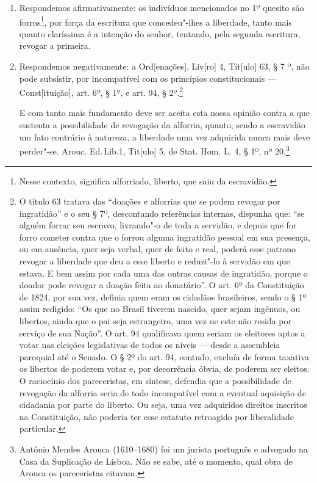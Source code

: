 \begin{enumerate}[label=Ao \arabic*º]
\item Respondemos afirmativamente: os indivíduos mencionados no 1º
quesito são forros\footnote{Nesse contexto, significa alforriado,
  liberto, que saiu da escravidão.}, por força da escritura que
concedeu"-lhes a liberdade, tanto mais quanto claríssima é a intenção do
senhor, tentando, pela segunda escritura, revogar a primeira.

\item Respondemos negativamente: a Ord{[}enações{]}, Liv{[}ro{]} 4,
Tít{[}ulo{]} 63, § 7 º, não pode subsistir, por incompatível com os
princípios constitucionais --- Const{[}ituição{]}, art. 6º, § 1º, e
art. 94, § 2º.\footnote{O título 63 tratava das ``doações e alforrias
  que se podem revogar por ingratidão'' e o seu § 7º, descontando
  referências internas, dispunha que: ``se alguém forrar seu escravo,
  livrando"-o de toda a servidão, e depois que for forro cometer contra
  que o forrou alguma ingratidão pessoal em sua presença, ou em
  ausência, quer seja verbal, quer de feito e real, poderá esse patrono
  revogar a liberdade que deu a esse liberto e reduzi"-lo à servidão em
  que estava. E bem assim por cada uma das outras causas de ingratidão,
  porque o doador pode revogar a doação feita ao donatário''. O art. 6º
  da Constituição de 1824, por sua vez, definia quem eram os cidadãos
  brasileiros, sendo o § 1º assim redigido: ``Os que no Brasil tiverem
  nascido, quer sejam ingênuos, ou libertos, ainda que o pai seja
  estrangeiro, uma vez ue este não resida por serviço de sua Nação''. O
  art. 94 qualificava quem seriam os eleitores aptos a votar nas
  eleições legislativas de todos os níveis --- desde a assembleia
  paroquial até o Senado. O § 2º do art. 94, contudo, excluía de forma
  taxativa os libertos de poderem votar e, por decorrência óbvia, de
  poderem ser eleitos. O raciocínio dos pareceristas, em síntese,
  defendia que a possibilidade de revogação da alforria seria de todo
  incompatível com a eventual aquisição de cidadania por parte do
  liberto. Ou seja, uma vez adquiridos direitos inscritos na
  Constituição, não poderia ter esse estatuto retroagido por
  liberalidade particular.}

E com tanto mais fundamento deve ser aceita esta nossa opinião contra a
que sustenta a possibilidade de revogação da alforria, quanto, sendo a
escravidão um fato contrário à natureza, a liberdade uma vez adquirida
nunca mais deve perder"-se. Arouc. Ed.\,Lib.1, Tit{[}ulo{]} 5, de Stat.
Hom. L. 4, § 1º, nº 20.\footnote{António Mendes Arouca (1610--1680) foi
  um jurista português e advogado na Casa da Suplicação de Lisboa. Não
  se sabe, até o momento, qual obra de Arouca os pareceristas citavam.}


\end{enumerate}
